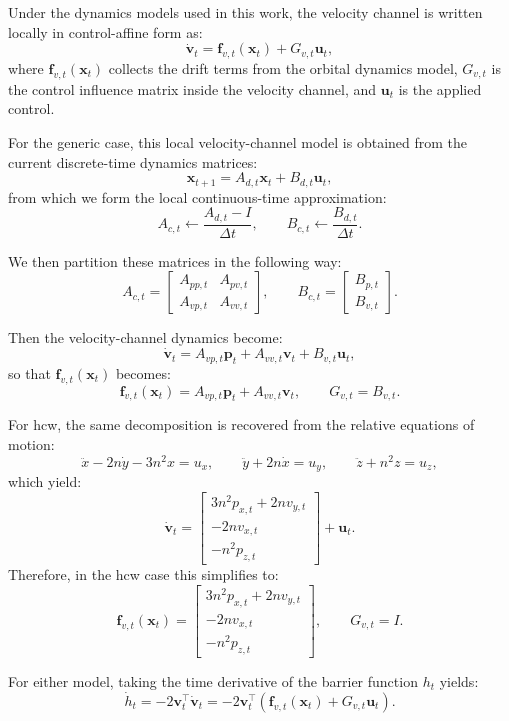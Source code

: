 Under the dynamics models used in this work, the velocity channel is written locally in control-affine form as:
\[
\dot{\mathbf{v}}_t
=
\mathbf{f}_{v,t}(\mathbf{x}_t)
+
G_{v,t}\mathbf{u}_t,
\]
where $\mathbf{f}_{v,t}(\mathbf{x}_t)$ collects the drift terms from the orbital dynamics model, $G_{v,t}$ is the control influence matrix inside the velocity channel, and $\mathbf{u}_t$ is the applied control.

For the generic case, this local velocity-channel model is obtained from the current discrete-time dynamics matrices:
\[
\mathbf{x}_{t+1} = A_{d,t}\mathbf{x}_t + B_{d,t}\mathbf{u}_t,
\]
from which we form the local continuous-time approximation:
\[
A_{c,t}\leftarrow \frac{A_{d,t}-I}{\Delta t},\qquad
B_{c,t}\leftarrow \frac{B_{d,t}}{\Delta t}.
\]

We then partition these matrices in the following way:
\[
A_{c,t} =
\begin{bmatrix}
A_{pp,t} & A_{pv,t}\\
A_{vp,t} & A_{vv,t}
\end{bmatrix},
\qquad
B_{c,t} =
\begin{bmatrix}
B_{p,t}\\
B_{v,t}
\end{bmatrix}.
\]

Then the velocity-channel dynamics become:
\[
\dot{\mathbf{v}}_t
=
A_{vp,t}\mathbf{p}_t
+
A_{vv,t}\mathbf{v}_t
+
B_{v,t}\mathbf{u}_t,
\]
so that $\mathbf{f}_{v,t}(\mathbf{x}_t)$ becomes:
\[
\mathbf{f}_{v,t}(\mathbf{x}_t)
=
A_{vp,t}\mathbf{p}_t + A_{vv,t}\mathbf{v}_t,
\qquad
G_{v,t}=B_{v,t}.
\]

For \acs{hcw}, the same decomposition is recovered from the relative equations of motion:
\[
\ddot{x}-2n\dot{y}-3n^2x=u_x,\qquad
\ddot{y}+2n\dot{x}=u_y,\qquad
\ddot{z}+n^2 z=u_z,
\]
which yield:
\[
\dot{\mathbf{v}}_t
=
\begin{bmatrix}
3n^2 p_{x,t}+2n v_{y,t}\\
-2n v_{x,t}\\
-n^2 p_{z,t}
\end{bmatrix}
+
\mathbf{u}_t.
\]
Therefore, in the \acs{hcw} case this simplifies to:
\[
\mathbf{f}_{v,t}(\mathbf{x}_t)=
\begin{bmatrix}
3n^2 p_{x,t}+2n v_{y,t}\\
-2n v_{x,t}\\
-n^2 p_{z,t}
\end{bmatrix},
\qquad
G_{v,t}=I.
\]

For either model, taking the time derivative of the barrier function $h_t$ yields:
\[
\dot{h}_t = -2\mathbf{v}_t^\top \dot{\mathbf{v}}_t
= -2\mathbf{v}_t^\top\left(\mathbf{f}_{v,t}(\mathbf{x}_t)+G_{v,t}\mathbf{u}_t\right).
\]

